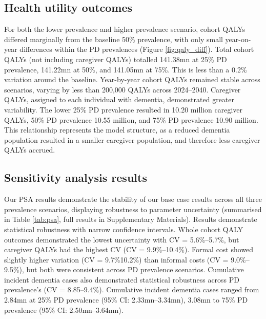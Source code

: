 \documentclass[11pt,a4paper]{article}
\begin{document}
\subsection{Health utility outcomes}

For both the lower prevalence and higher prevalence scenario, cohort QALYs differed marginally from the baseline 50\% prevalence, with only small year-on-year differences within the PD prevalences (Figure \ref{fig:qaly_diff}). Total cohort QALYs (not including caregiver QALYs) totalled 141.38mn at 25\% PD prevalence, 141.22mn at 50\%, and 141.05mn at 75\%. This is less than a 0.2\% variation around the baseline. Year-by-year cohort QALYs remained stable across scenarios, varying by less than 200,000 QALYs across 2024--2040. Caregiver QALYs, assigned to each individual with dementia, demonstrated greater variability. The lower 25\% PD prevalence resulted in 10.20 million caregiver QALYs, 50\% PD prevalence 10.55 million, and 75\% PD prevalence 10.90 million. This relationship represents the model structure, as a reduced dementia population resulted in a smaller caregiver population, and therefore less caregiver QALYs accrued.

\subsection{Sensitivity analysis results}

Our PSA results demonstrate the stability of our base case results across all three prevalence scenarios, displaying robustness to parameter uncertainty (summarised in Table \ref{tab:psa}, full results in Supplementary Materials). Results demonstrate statistical robustness with narrow confidence intervals. Whole cohort QALY outcomes demonstrated the lowest uncertainty with CV = 5.6\%--5.7\%, but caregiver QALYs had the highest CV (CV = 9.9\%--10.4\%). Formal cost showed slightly higher variation (CV = 9.7\%10.2\%) than informal costs (CV = 9.0\%--9.5\%), but both were consistent across PD prevalence scenarios. Cumulative incident dementia cases also demonstrated statistical robustness across PD prevalence's (CV = 8.85--9.4\%). Cumulative incident dementia cases ranged from 2.84mn at 25\% PD prevalence (95\% CI: 2.33mn--3.34mn), 3.08mn to 75\% PD prevalence (95\% CI: 2.50mn--3.64mn).
\end{document}
